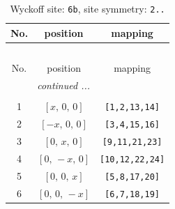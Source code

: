 \documentclass[fleqn,8pt]{jsarticle}
\begin{document}
\renewcommand{\arraystretch}{1.2}
\begin{longtable}{ccc}
\caption{Wyckoff site: {\tt 6b}, site symmetry: {\tt 2..}}
 \\
 \hline \hline
No. & position & mapping \\ \hline \endfirsthead

\multicolumn{2}{l}{\tablename\ \thetable{}} \\
 \hline \hline
No. & position & mapping \\ \hline \endhead

 \hline \hline
\multicolumn{2}{r}{\footnotesize\it continued ...} \\ \endfoot

 \hline \hline
\multicolumn{2}{r}{} \\ \endlastfoot

1 & $\left[ x,\, 0,\, 0 \right]$ & {\tt [1,2,13,14]} \\ \hline
2 & $\left[ - x,\, 0,\, 0 \right]$ & {\tt [3,4,15,16]} \\ \hline
3 & $\left[ 0,\, x,\, 0 \right]$ & {\tt [9,11,21,23]} \\ \hline
4 & $\left[ 0,\, - x,\, 0 \right]$ & {\tt [10,12,22,24]} \\ \hline
5 & $\left[ 0,\, 0,\, x \right]$ & {\tt [5,8,17,20]} \\ \hline
6 & $\left[ 0,\, 0,\, - x \right]$ & {\tt [6,7,18,19]} \\
\end{longtable}
\renewcommand{\arraystretch}{1.2}
\end{document}
